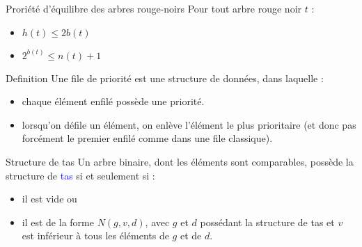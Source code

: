 \documentclass[10pt]{beamer}
\begin{document}
\begin{frame}[fragile]{\Ctitle}{\stitle}
	\begin{block}{Proriété d'équilibre des arbres rouge-noirs}
		Pour tout arbre rouge noir $t$ :
		\begin{itemize}
			\item<2-> $h(t) \leqslant 2b(t)$ 
			\item<3-> $2^{b(t)} \leqslant n(t) +1$
		\end{itemize}
	\end{block}
\end{frame}



\begin{frame}[fragile]{\Ctitle}{\stitle}
	\begin{block}{Definition}
		Une file de priorité est une structure de données, dans laquelle :
		\begin{itemize}
		\item<2-> chaque élément enfilé possède une priorité.
		\item<3-> lorsqu'on défile un élément, on enlève l'élément le plus prioritaire (et donc pas forcément le premier enfilé comme dans une file classique).
		\end{itemize}
	\end{block}
\end{frame}

\begin{frame}[fragile]{\Ctitle}{\stitle}
	\begin{alertblock}{Structure de tas}
		Un arbre binaire, dont les éléments sont comparables, possède la structure de \textcolor{blue}{tas} si et seulement si :
		\begin{itemize}
			\item<2-> il est vide ou
			\item<3-> il est de la forme $N(g,v,d)$, avec $g$ et $d$ possédant la structure de tas et $v$ est inférieur à tous les éléments de $g$ et de $d$. 
		\end{itemize}
	\end{alertblock}
\end{frame}
\end{document}
